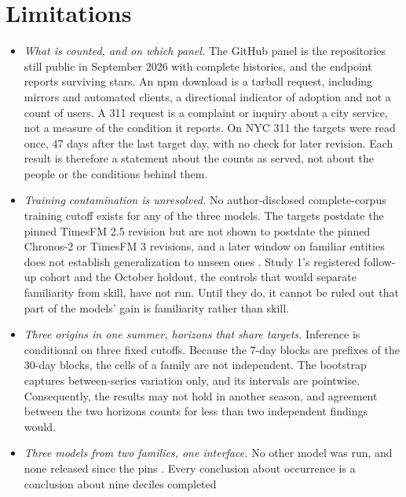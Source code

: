 \providecommand{\qs}{QScore9}

\section{Limitations}
\label{sec:limitations}
\label{sec:notrun}

\begin{itemize}
\item \emph{What is counted, and on which panel.} The GitHub panel is the repositories still public in
  September 2026 with complete histories, and the endpoint reports surviving stars. An npm download is a
  tarball request, including mirrors and automated clients, a directional indicator of adoption and not a
  count of users. A 311 request is a complaint or inquiry about a city service, not a measure of the condition
  it reports. On NYC 311 the targets were read once, 47 days after the last target day, with no check for
  later revision. Each result is therefore a statement about the counts as served, not about the people or the
  conditions behind them.
\item \emph{Training contamination is unresolved.} No author-disclosed complete-corpus training cutoff exists
  for any of the three models. The targets postdate the pinned TimesFM 2.5 revision but are not shown to
  postdate the pinned Chronos-2 or TimesFM 3 revisions, and a later window on familiar entities does not
  establish generalization to unseen ones \citep{moghadasi2026, qiao2026, li2026}. Study 1's registered
  follow-up cohort and the October holdout, the controls that would separate familiarity from skill, have not
  run. Until they do, it cannot be ruled out that part of the models' gain is familiarity rather than skill.
\item \emph{Three origins in one summer, horizons that share targets.} Inference is conditional on three fixed
  cutoffs. Because the 7-day blocks are prefixes of the 30-day blocks, the cells of a family are not
  independent. The bootstrap captures between-series variation only, and its intervals are pointwise.
  Consequently, the results may not hold in another season, and agreement between the two horizons counts for
  less than two independent findings would.
\item \emph{Three models from two families, one interface.} No other model was run, and none released since
  the pins \citep{exaone2026}. Every conclusion about occurrence is a conclusion about nine deciles completed

\end{itemize}
